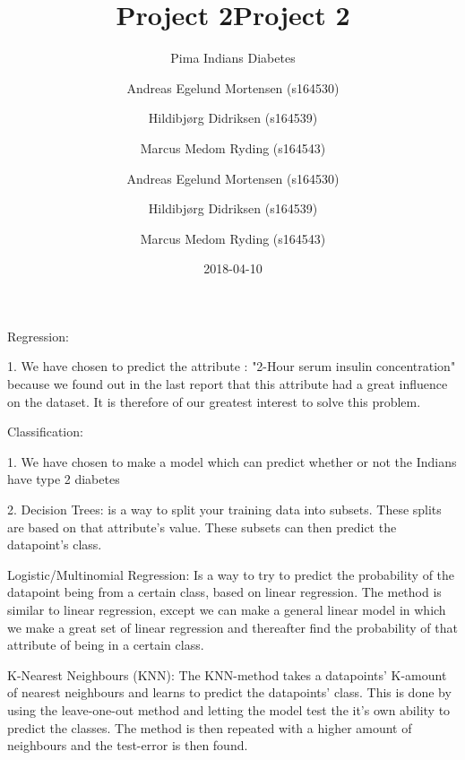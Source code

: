\documentclass[english,a4paper,,tablecaptionabove]{scrartcl}
\title{Project 2}
\subtitle{Pima Indians Diabetes}
\author{Andreas Egelund Mortensen (s164530) \and Hildibjørg Didriksen (s164539) \and Marcus Medom Ryding (s164543)}
\date{2018-04-10}
\title{Project 2}
\author{Andreas Egelund Mortensen (s164530) \and Hildibjørg Didriksen (s164539) \and Marcus Medom Ryding (s164543)}
\begin{document}

\begin{titlepage}
\newcommand{\colorRule}[3][black]{\textcolor[HTML]{#1}{\rule{#2}{#3}}}
\end{titlepage}
\restoregeometry



{
\setcounter{tocdepth}{3}
\tableofcontents
}


Regression:

1.
We have chosen to predict the attribute : "2-Hour serum insulin concentration"
because we found out in the last report that this attribute had a great influence on the dataset.
It is therefore of our greatest interest to solve this problem.


Classification:

1.
We have chosen to make a model which can predict whether or not the Indians have type 2 diabetes

2.
Decision Trees:
is a way to split your training data into subsets. These splits are based on that attribute's value.
These subsets can then predict the datapoint's class.

Logistic/Multinomial Regression:
Is a way to try to predict the probability of the datapoint being from a certain class,
based on linear regression.
The method is similar to linear regression, except we can make a general linear model in which we make a great set of linear regression
and thereafter find the probability of that attribute of being in a certain class.

K-Nearest Neighbours (KNN):
The KNN-method takes a datapoints' K-amount of nearest neighbours and learns to predict the datapoints' class.
This is done by using the leave-one-out method and letting the model test the it's own ability to predict the classes.
The method is then repeated with a higher amount of neighbours and the test-error is then found.
\end{document}
